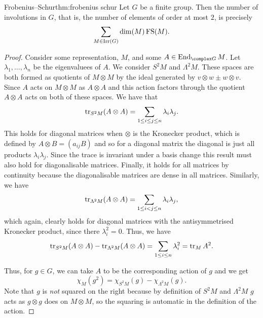 \begin{thm}{Frobenius--Schur}{thm:frobenius schur}
    Let \(G\) be a finite group.
    Then the number of involutions in \(G\), that is, the number of elements of order at most \(2\), is precisely
    \begin{equation}
        \sum_{M \in \operatorname{Irr}(G)} \dim(M) \operatorname{FS}(M).
    \end{equation}
    \begin{proof}
        Consider some representation, \(M\), and some \(A \in \End_{\complex G}M\).
        Let \(\lambda_1, \dotsc, \lambda_n\) be the eigenvaluees of \(A\).
        We consider \(S^2M\) and \(\Lambda^2M\).
        These spaces are both formed as quotients of \(M \otimes M\) by the ideal generated by \(v \otimes w \pm w \otimes v\).
        Since \(A\) acts on \(M \otimes M\) as \(A \otimes A\) and this action factors through the quotient \(A \otimes A\) acts on both of these spaces.
        We have that
        \begin{equation}
            \operatorname{tr}_{S^2 M}(A \otimes A) = \sum_{1 \le i \le j \le n} \lambda_i \lambda_j.
        \end{equation}
        This holds for diagonal matrices when \(\otimes\) is the Kronecker product, which is defined by \(A \otimes B = (a_{ij}B)\) and so for a diagonal matrix the diagonal is just all products \(\lambda_i \lambda_j\).
        Since the trace is invariant under a basis change this result must also hold for diagonalisable matrices.
        Finally, it holds for all matrices by continuity because the diagonalisable matrices are dense in all matrices.
        Similarly, we have
        \begin{equation}
            \operatorname{tr}_{\Lambda^2 M}(A \otimes A) = \sum_{1 \le i < j \le n} \lambda_i \lambda_j,
        \end{equation}
        which again, clearly holds for diagonal matrices with the antisymmetrised Kronecker product, since there \(\lambda_i^2 = 0\).
        Thus, we have
        \begin{equation}
            \operatorname{tr}_{S^2M} (A \otimes A) - \operatorname{tr}_{\Lambda^2 M}(A \otimes A) = \sum_{1 \le i \le n} \lambda_i^2 = \operatorname{tr}_{M} A^2.
        \end{equation}
        
        Thus, for \(g \in G\), we can take \(A\) to be the corresponding action of \(g\) and we get
        \begin{equation}
            \chi_M(g^2) = \chi_{S^2M}(g) - \chi_{\Lambda^2M}(g).
        \end{equation}
        Note that \(g\) is \emph{not} squared on the right because by definition of \(S^2M\) and \(\Lambda^2M\) \(g\) acts as \(g \otimes g\) does on \(M \otimes M\), so the squaring is automatic in the definition of the action.
        

\end{proof}
\end{thm}
